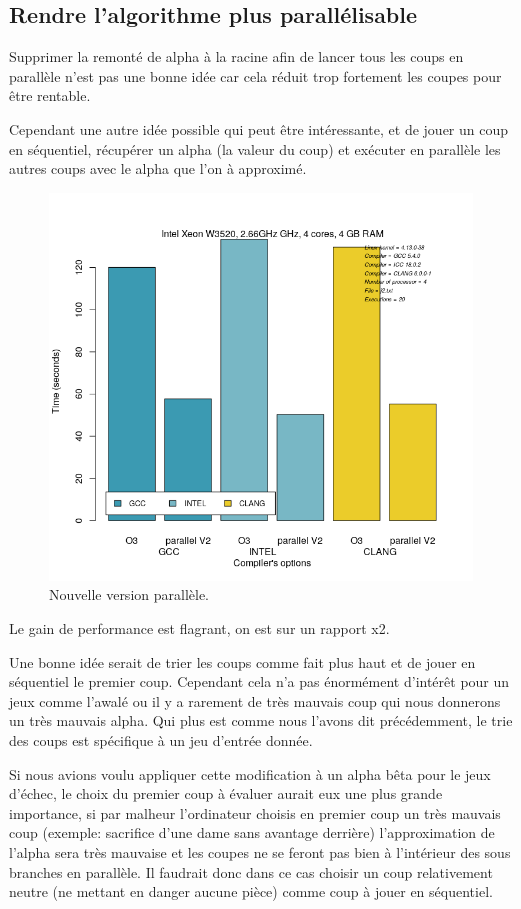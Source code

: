 \documentclass[
 aip,
 jmp,
 amsmath,amssymb,
 reprint
]{revtex4-1}
\begin{document}
\subsection{Rendre l'algorithme plus parallélisable}
Supprimer la remonté de alpha à la racine afin de lancer tous les coups en parallèle n'est pas une bonne idée car cela réduit trop fortement les coupes pour être rentable.\par
Cependant une autre idée possible qui peut être intéressante, et de jouer un coup en séquentiel, récupérer un alpha (la valeur du coup) et exécuter en parallèle les autres coups avec le alpha que l'on à approximé.

\begin{figure}[H]
  \includegraphics[width=\linewidth, keepaspectratio=true]{parallel_v2.png}
  \caption{Nouvelle version parallèle.\label{Fig:parallele_v2}}
\end{figure}

Le gain de performance est flagrant, on est sur un rapport x2.\par
Une bonne idée serait de trier les coups comme fait plus haut et de jouer en séquentiel le premier coup. Cependant cela n'a pas énormément d'intérêt pour un jeux comme l'awalé ou il y a rarement de très mauvais coup qui nous donnerons un très mauvais alpha. Qui plus est comme nous l'avons dit précédemment, le trie des coups est spécifique à un jeu d'entrée donnée.\par
Si nous avions voulu appliquer cette modification à un alpha bêta pour le jeux d'échec, le choix du premier coup à évaluer aurait eux une plus grande importance, si par malheur l'ordinateur choisis en premier coup un très mauvais coup (exemple: sacrifice d'une dame sans avantage derrière) l'approximation de l'alpha sera très mauvaise et les coupes ne se feront pas bien à l'intérieur des sous branches en parallèle. Il faudrait donc dans ce cas choisir un coup relativement neutre (ne mettant en danger aucune pièce) comme coup à jouer en séquentiel.\par
\end{document}
